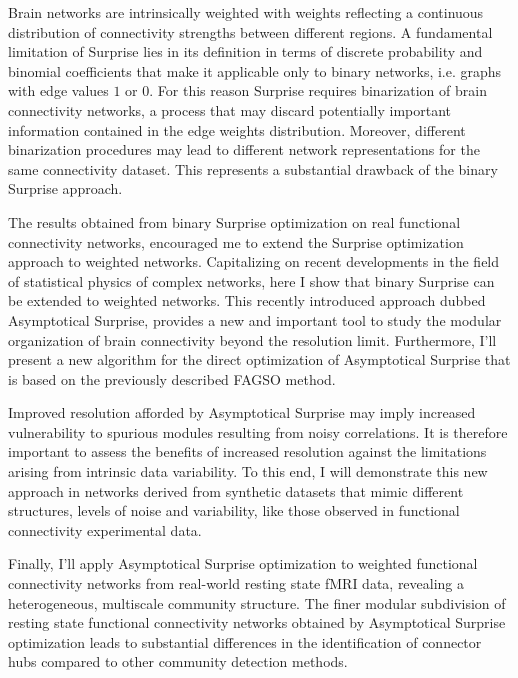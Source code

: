 Brain networks are intrinsically weighted with weights reflecting a continuous distribution of connectivity strengths between different regions.
A fundamental limitation of Surprise lies in its definition in terms of discrete probability and binomial coefficients that make it applicable only to binary networks, i.e.
graphs with edge values $1$ or $0$.
For this reason Surprise requires binarization of brain connectivity networks, a process that may discard potentially important information contained in the edge weights distribution.
Moreover, different binarization procedures may lead to different network representations for the same connectivity dataset.
This represents a substantial drawback of the binary Surprise approach.

The results obtained from binary Surprise optimization on real functional connectivity networks, encouraged me to extend the Surprise optimization approach to weighted networks. 
Capitalizing on recent developments in the field of statistical physics of complex networks, here I show that binary Surprise can be extended to weighted networks.
This recently introduced approach dubbed Asymptotical Surprise, provides a new and important tool to study the modular organization of brain connectivity beyond the resolution limit.
Furthermore, I'll present a new algorithm for the direct optimization of Asymptotical Surprise that is based on the previously described FAGSO method.

Improved resolution afforded by Asymptotical Surprise may imply increased vulnerability to spurious modules resulting from noisy correlations.
It is therefore important to assess the benefits of increased resolution against the limitations arising from intrinsic data variability.
To this end, I will demonstrate this new approach in networks derived from synthetic datasets that mimic different structures, levels of noise and variability, like those observed in functional connectivity experimental data.

Finally, I'll apply Asymptotical Surprise optimization to weighted functional connectivity networks from real-world resting state fMRI data, revealing a heterogeneous, multiscale community structure.
The finer modular subdivision of resting state functional connectivity networks obtained by Asymptotical Surprise optimization leads to substantial differences in the identification of connector hubs compared to other community detection methods.

